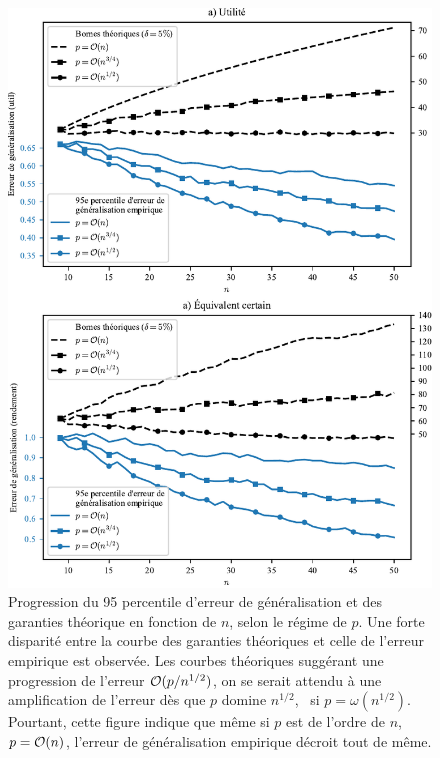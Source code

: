 \begin{figure}[h!]
  \centering
  \includegraphics[width=\textwidth]{../experiments/fig/bound_npgenu.pdf}
  \caption[Erreur de généralisation -- Régimes $p=\bigO(n^{1/2}),\bigO(n^{3/4}),\bigO(n)$]
  {Progression du 95\ieme
    percentile d'erreur de généralisation et des garanties théorique en fonction de $n$,
    selon le régime de $p$. Une forte disparité entre la courbe des garanties théoriques
    et celle de l'erreur empirique est observée. Les courbes théoriques suggérant une
    progression de l'erreur $\mathcal O(p/n^{1/2})$, on se serait attendu à une amplification
    de l'erreur dès que $p$ domine $n^{1/2}$, \ie\ si $p=\omega(n^{1/2})$. Pourtant, cette
    figure indique que même si $p$ est de l'ordre de $n$, \ie\ $p = \mathcal O(n)$, l'erreur de
    généralisation empirique décroit tout de même.  }
  \label{fig_bound_npgenu}
\end{figure}

